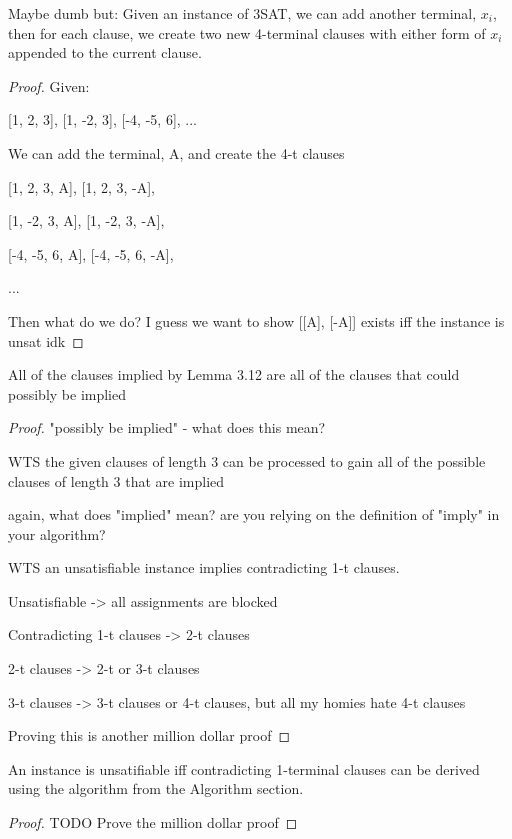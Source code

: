 \documentclass[manuscript]{acmart}
\begin{document}
    \begin{lemma}
        Maybe dumb but: Given an instance of 3SAT, we can add another terminal, $x_i$, 
        then for each clause, we create two new 4-terminal clauses with either form of $x_i$
        appended to the current clause.
    \end{lemma}
    \begin{proof}
        Given:

        [1, 2, 3], [1, -2, 3], [-4, -5, 6], ...

        We can add the terminal, A, and create the 4-t clauses

        [1, 2, 3, A], [1, 2, 3, -A], 
    
        [1, -2, 3, A], [1, -2, 3, -A],

        [-4, -5, 6, A], [-4, -5, 6, -A], 

        ...

        Then what do we do? I guess we want to show [[A], [-A]] exists iff the instance is unsat idk

    \end{proof}

    \begin{lemma}
        All of the clauses implied by Lemma 3.12 are all of the clauses that could possibly be implied
    \end{lemma}
    \begin{proof}
        "possibly be implied" - what does this mean?

        WTS the given clauses of length 3 can be processed to gain all of the 
        possible clauses of length 3 that are implied

        again, what does "implied" mean? are you relying on the definition of
        "imply" in your algorithm?

        WTS an unsatisfiable instance implies contradicting 1-t clauses. 

        Unsatisfiable -> all assignments are blocked

        Contradicting 1-t clauses -> 2-t clauses

        2-t clauses -> 2-t or 3-t clauses

        3-t clauses -> 3-t clauses or 4-t clauses, but all my homies hate 4-t clauses

        Proving this is another million dollar proof
    \end{proof}

    \begin{lemma}
        An instance is unsatifiable iff contradicting 1-terminal clauses can 
        be derived using the algorithm from the Algorithm section.
    \end{lemma}
    \begin{proof}
        TODO Prove the million dollar proof
    \end{proof}
\end{document}
